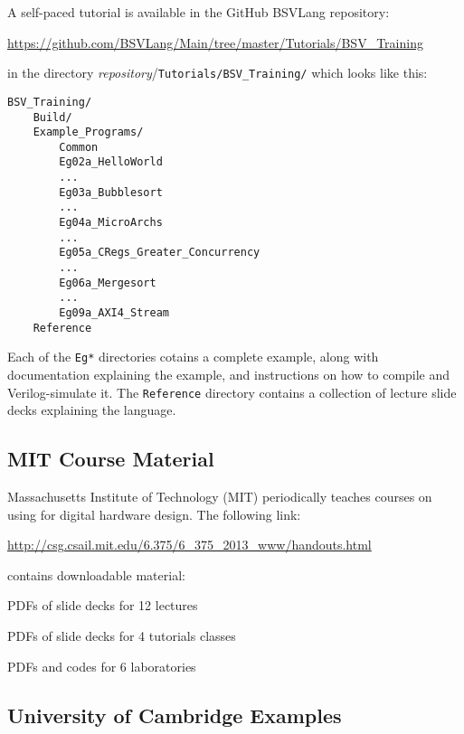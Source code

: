 A {\BSV} self-paced tutorial is available in the GitHub BSVLang repository:

\url{https://github.com/BSVLang/Main/tree/master/Tutorials/BSV_Training}

in the directory   \emph{repository}/\verb|Tutorials/BSV_Training/| which looks like this:

\begin{Verbatim}[frame=single]
BSV_Training/
    Build/
    Example_Programs/
        Common
        Eg02a_HelloWorld
        ...
        Eg03a_Bubblesort
        ...
        Eg04a_MicroArchs
        ...
        Eg05a_CRegs_Greater_Concurrency
        ...
        Eg06a_Mergesort
        ...
        Eg09a_AXI4_Stream
    Reference
\end{Verbatim}

Each of the \verb|Eg*| directories cotains a complete example, along
with documentation explaining the example, and instructions on how to
compile and Verilog-simulate it.  The \verb|Reference| directory
contains a collection of lecture slide decks explaining the {\BSV}
language.


\subsection{MIT Course Material}

Massachusetts Institute of Technology (MIT) periodically teaches
courses on using {\BSV} for digital hardware design.  The following link:

\url{http://csg.csail.mit.edu/6.375/6_375_2013_www/handouts.html}

contains downloadable material:

\begin{tightlist}

  \item PDFs of slide decks for 12 lectures

  \item PDFs of slide decks for 4 tutorials classes

  \item PDFs and codes for 6 laboratories

\end{tightlist}


\subsection{University of Cambridge Examples}

